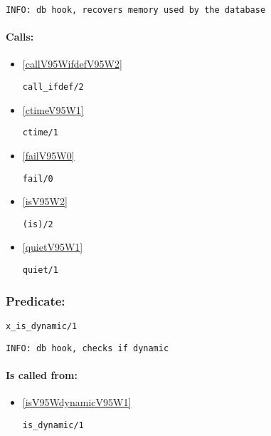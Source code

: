 {\small \begin{verbatim}
INFO: db hook, recovers memory used by the database

\end{verbatim}}
\paragraph{Calls:} 
\begin{itemize}
\item \ref{callV95WifdefV95W2} 
\begin{verbatim}
call_ifdef/2
\end{verbatim}

\item \ref{ctimeV95W1} 
\begin{verbatim}
ctime/1
\end{verbatim}

\item \ref{failV95W0} 
\begin{verbatim}
fail/0
\end{verbatim}

\item \ref{isV95W2} 
\begin{verbatim}
(is)/2
\end{verbatim}

\item \ref{quietV95W1} 
\begin{verbatim}
quiet/1
\end{verbatim}

\end{itemize}

\subsubsection{Predicate:} \label{xV95WisV95WdynamicV95W1}

\begin{verbatim}
x_is_dynamic/1
\end{verbatim}

{\small \begin{verbatim}
INFO: db hook, checks if dynamic

\end{verbatim}}
\paragraph{Is called from:} 
\begin{itemize}
\item \ref{isV95WdynamicV95W1} 
\begin{verbatim}
is_dynamic/1
\end{verbatim}

\end{itemize}

